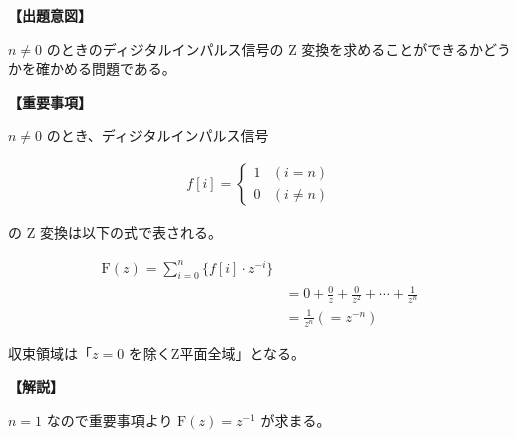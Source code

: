\noindent \textbf{【出題意図】}

\bigskip
\noindent $n \ne 0 $ のときのディジタルインパルス信号の Z 変換を求めることができるかどうかを確かめる問題である。

\vspace{1em}
\noindent \textbf{【重要事項】}

\medskip
$n \ne 0 $ のとき、ディジタルインパルス信号 

\begin{align}
f[i] =
\begin{cases}
1 & (i=n) \\ 
0 & (i \neq n)
\end{cases}
\end{align}

の Z 変換は以下の式で表される。

\begin{align*}
\textrm{F}(z) = \sum_{i=0}^{n} \{ f[i] \cdot z^{-i} \} \\
& = 0 + \frac{0}{z} + \frac{0}{z^2} + \cdots + \frac{1}{z^{n}} \\
& = \frac{1}{z^{n}} (= z^{-n})
\end{align*}

\medskip
\noindent 収束領域は「$z=0$ を除くZ平面全域」となる。

\bigskip

\vspace{1em}
\noindent \textbf{【解説】}

\bigskip
\noindent $n = 1$ なので重要事項より $\textrm{F}(z) = z^{-1} $ が求まる。
